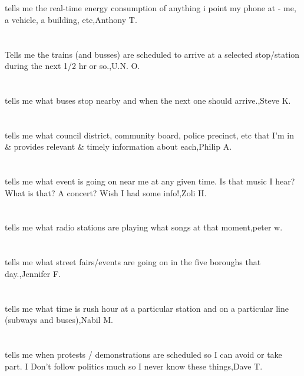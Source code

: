 \section{}tells me the real-time energy consumption of anything i point my phone at - me, a vehicle, a building, etc,Anthony T.	
\section{} Tells me the trains (and busses) are scheduled to arrive at a selected stop/station during the next 1/2 hr or so.,U.N. O.	
\section{}tells me what buses stop nearby and when the next one should arrive.,Steve K.	
\section{}tells me what council district, community board, police precinct, etc that I'm in \& provides relevant \& timely information about each,Philip A.	
\section{}tells me what event is going on near me at any given time. Is that music I hear? What is that? A concert? Wish I had some info!,Zoli H.	
\section{} tells me what radio stations are playing what songs at that moment,peter w.	
\section{}tells me what street fairs/events are going on in the five boroughs that day.,Jennifer F.	
\section{}tells me what time is rush hour at a particular station and on a particular line (subways and buses),Nabil M.	
\section{} tells me when protests / demonstrations are scheduled so I can avoid or take part. I Don't follow politics much so I never know these things,Dave T.	
